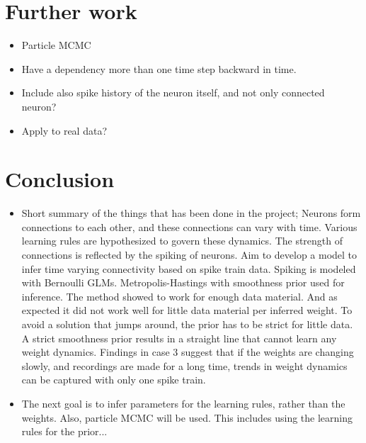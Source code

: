 \section{Further work}
\begin{itemize}
    \item Particle MCMC
    \item Have a dependency more than one time step backward in time. 
    \item Include also spike history of the neuron itself, and not only connected neuron?
    \item Apply to real data?
    
\end{itemize}

\section{Conclusion}

\begin{itemize}
    \item Short summary of the things that has been done in the project; Neurons form connections to each other, and these connections can vary with time. Various learning rules are hypothesized to govern these dynamics. The strength of connections is reflected by the spiking of neurons. Aim to develop a model to infer time varying connectivity based on spike train data. Spiking is modeled with Bernoulli GLMs. Metropolis-Hastings with smoothness prior used for inference. The method showed to work for enough data material. And as expected it did not work well for little data material per inferred weight. To avoid a solution that jumps around, the prior has to be strict for little data. A strict smoothness prior results in a straight line that cannot learn any weight dynamics. Findings in case 3 suggest that if the weights are changing slowly, and recordings are made for a long time, trends in weight dynamics can be captured with only one spike train.
    \item The next goal is to infer parameters for the learning rules, rather than the weights. Also, particle MCMC will be used. This includes using the learning rules for the prior... 
\end{itemize}



\cleardoublepage